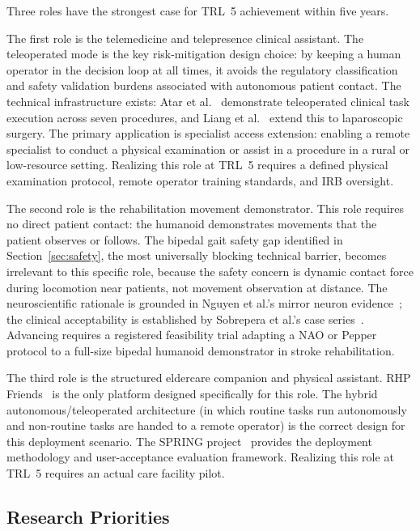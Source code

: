 \documentclass[acmjour]{acmart}
\begin{document}
Three roles have the strongest case for TRL~5 achievement within five years.

The first role is the telemedicine and telepresence clinical assistant. The
teleoperated mode is the key risk-mitigation design choice: by keeping a human operator in the
decision loop at all times, it avoids the regulatory classification and safety
validation burdens associated with autonomous patient contact. The technical
infrastructure exists: Atar et al.~\cite{atar2025humanoids} demonstrate
teleoperated clinical task execution across seven procedures, and Liang et
al.~\cite{liang2025lapsurgie} extend this to laparoscopic surgery. The primary
application is specialist access extension: enabling a remote specialist to
conduct a physical examination or assist in a procedure in a rural or low-resource
setting. Realizing this role at TRL~5 requires a defined physical examination
protocol, remote operator training standards, and IRB oversight.

The second role is the rehabilitation movement demonstrator. This role requires no
direct patient contact: the humanoid demonstrates movements that the patient
observes or follows. The bipedal gait safety gap identified in
Section~\ref{sec:safety}, the most universally blocking technical
barrier, becomes irrelevant to this specific role, because the safety concern is
dynamic contact force during locomotion near patients, not movement observation at
distance. The neuroscientific rationale is grounded in Nguyen et al.'s mirror
neuron evidence~\cite{nguyen2024eeg}; the clinical acceptability is established by
Sobrepera et al.'s case series~\cite{sobrepera2022feasibility}. Advancing requires a registered
feasibility trial adapting a NAO or Pepper protocol to a full-size bipedal
humanoid demonstrator in stroke rehabilitation.

The third role is the structured eldercare companion and physical assistant. RHP
Friends~\cite{benallegue2025rhp} is the only platform designed specifically for
this role. The hybrid autonomous/teleoperated architecture (in which routine
tasks run autonomously and non-routine tasks are handed to a remote
operator) is the correct design for this deployment scenario. The SPRING
project~\cite{alamedapineda2024spring} provides the deployment methodology and
user-acceptance evaluation framework. Realizing this role at TRL~5 requires an
actual care facility pilot.

\subsection{Research Priorities}
\label{sec:research}
\end{document}
